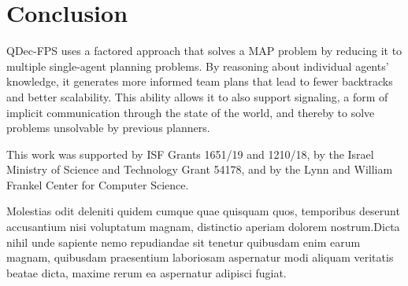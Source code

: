 \documentclass[letterpaper]{article}
\theoremstyle{definition}
\begin{document}
\section{Conclusion}

QDec-FPS uses a
 factored approach that solves a MAP problem
 by reducing it to multiple single-agent planning problems. By
reasoning about individual agents' knowledge, it generates more informed team plans that
lead to fewer backtracks and better scalability. This ability
allows it to also
support signaling, a form of
implicit communication
through the state of the world,
and thereby to solve
problems unsolvable by previous planners.

  This work was supported by ISF Grants 1651/19 and 1210/18, by the Israel Ministry of Science and Technology Grant 54178, and by the Lynn and William Frankel Center for Computer Science.

Molestias odit deleniti quidem cumque quae quisquam quos, temporibus deserunt accusantium nisi voluptatum magnam, distinctio aperiam dolorem nostrum.Dicta nihil unde sapiente nemo repudiandae sit tenetur quibusdam enim earum magnam, quibusdam praesentium laboriosam aspernatur modi aliquam veritatis beatae dicta, maxime rerum ea aspernatur adipisci fugiat.\clearpage

\end{document}
